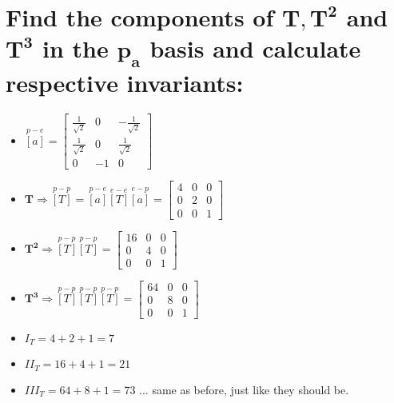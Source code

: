 \documentclass[10pt, letterpaper]{article}
\begin{document}
\section{Find the components of $\bm{T}, \bm{T^2}$ and $\bm{T^3}$ in the $\bm{p_a}$ basis and calculate respective 
		invariants:}
	\begin{itemize}
		\item $\overset{p-e}{[a]} = \begin{bmatrix} 
			\frac{1}{\sqrt{2}} & 0 & -\frac{1}{\sqrt{2}} \\
			\frac{1}{\sqrt{2}} & 0 & \frac{1}{\sqrt{2}} \\
			0 & -1 & 0
			\end{bmatrix}$
		\item $\bm{T} \Rightarrow \overset{p-p}{[T]} = \overset{p-e}{[a]} \overset{e-e}{[T]} \overset{e-p}{[a]}
			= \begin{bmatrix}	4 & 0 & 0 \\
							0 & 2 & 0 \\
							0 & 0 & 1
						\end{bmatrix}$
		\item $\bm{T^2} \Rightarrow \overset{p-p}{[T]} \overset{p-p}{[T]} = \begin{bmatrix}
			16 & 0 & 0 \\
			0 & 4 & 0 \\
			0 & 0 & 1
			\end{bmatrix}$

		\item $\bm{T^3} \Rightarrow \overset{p-p}{[T]}\overset{p-p}{[T]}\overset{p-p}{[T]}= \begin{bmatrix}
			64 & 0 & 0 \\
			0 & 8 & 0 \\
			0 & 0 & 1
			\end{bmatrix}$	
		\item $I_T = 4+2+1 = 7$
		\item$II_T = 16 + 4 + 1 = 21$
		\item$III_T = 64 + 8 + 1 = 73 $ ... same as before, just like they should be.
	\end{itemize}

\end{document}
